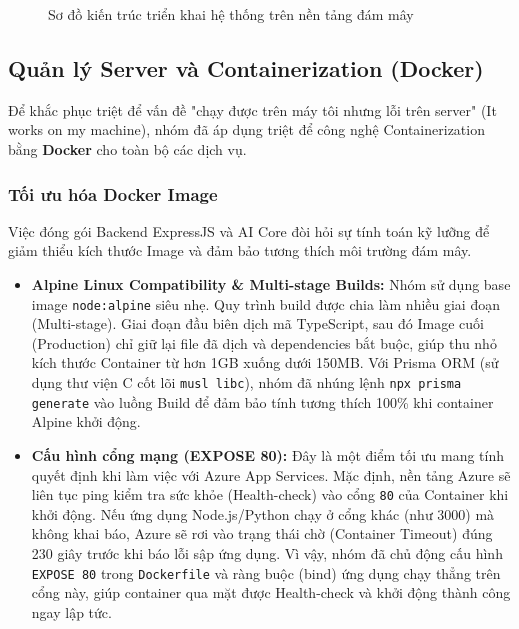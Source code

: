 \begin{figure}[H]
    \centering
    \caption{Sơ đồ kiến trúc triển khai hệ thống trên nền tảng đám mây}
    \label{fig:deployment_arch}
\end{figure}

\subsection{Quản lý Server và Containerization (Docker)}

Để khắc phục triệt để vấn đề "chạy được trên máy tôi nhưng lỗi trên server" (It works on my machine), nhóm đã áp dụng triệt để công nghệ Containerization bằng \textbf{Docker} cho toàn bộ các dịch vụ.

\subsubsection{Tối ưu hóa Docker Image}
Việc đóng gói Backend ExpressJS và AI Core đòi hỏi sự tính toán kỹ lưỡng để giảm thiểu kích thước Image và đảm bảo tương thích môi trường đám mây.
\begin{itemize}
    \item \textbf{Alpine Linux Compatibility \& Multi-stage Builds:} Nhóm sử dụng base image \texttt{node:alpine} siêu nhẹ. Quy trình build được chia làm nhiều giai đoạn (Multi-stage). Giai đoạn đầu biên dịch mã TypeScript, sau đó Image cuối (Production) chỉ giữ lại file đã dịch và dependencies bắt buộc, giúp thu nhỏ kích thước Container từ hơn 1GB xuống dưới 150MB. Với Prisma ORM (sử dụng thư viện C cốt lõi \texttt{musl libc}), nhóm đã nhúng lệnh \texttt{npx prisma generate} vào luồng Build để đảm bảo tính tương thích 100\% khi container Alpine khởi động.
    \item \textbf{Cấu hình cổng mạng (EXPOSE 80):} Đây là một điểm tối ưu mang tính quyết định khi làm việc với Azure App Services. Mặc định, nền tảng Azure sẽ liên tục ping kiểm tra sức khỏe (Health-check) vào cổng \texttt{80} của Container khi khởi động. Nếu ứng dụng Node.js/Python chạy ở cổng khác (như 3000) mà không khai báo, Azure sẽ rơi vào trạng thái chờ (Container Timeout) đúng 230 giây trước khi báo lỗi sập ứng dụng. Vì vậy, nhóm đã chủ động cấu hình \texttt{EXPOSE 80} trong \texttt{Dockerfile} và ràng buộc (bind) ứng dụng chạy thẳng trên cổng này, giúp container qua mặt được Health-check và khởi động thành công ngay lập tức.
\end{itemize}

